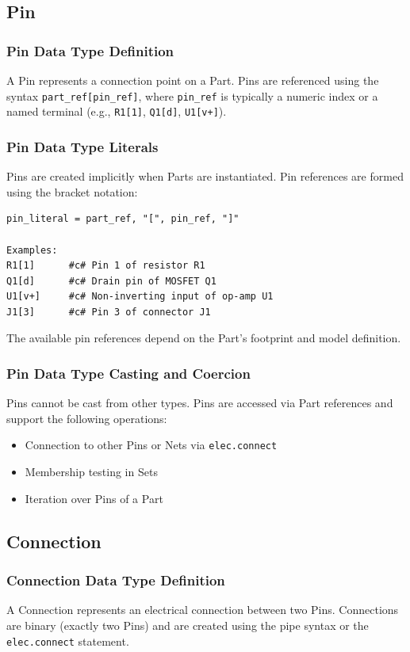 \documentclass{report}
\begin{document}
\subsection{Pin}
\subsubsection{Pin Data Type Definition}
A Pin represents a connection point on a Part. Pins are referenced using the syntax \texttt{part\_ref[pin\_ref]}, where \texttt{pin\_ref} is typically a numeric index or a named terminal (e.g., \texttt{R1[1]}, \texttt{Q1[d]}, \texttt{U1[v+]}).
\subsubsection{Pin Data Type Literals}
Pins are created implicitly when Parts are instantiated. Pin references are formed using the bracket notation:
\begin{verbatim}
pin_literal = part_ref, "[", pin_ref, "]"

Examples:
R1[1]      #c# Pin 1 of resistor R1
Q1[d]      #c# Drain pin of MOSFET Q1
U1[v+]     #c# Non-inverting input of op-amp U1
J1[3]      #c# Pin 3 of connector J1
\end{verbatim}
The available pin references depend on the Part's footprint and model definition.
\subsubsection{Pin Data Type Casting and Coercion}
Pins cannot be cast from other types. Pins are accessed via Part references and support the following operations:
\begin{itemize}
\item Connection to other Pins or Nets via \texttt{elec.connect}
\item Membership testing in Sets
\item Iteration over Pins of a Part
\end{itemize}
\subsection{Connection}
\subsubsection{Connection Data Type Definition}
A Connection represents an electrical connection between two Pins. Connections are binary (exactly two Pins) and are created using the pipe syntax or the \texttt{elec.connect} statement.
\end{document}
